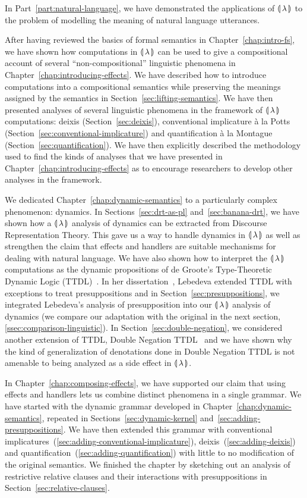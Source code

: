 In Part~\ref{part:natural-language}, we have demonstrated the applications
of ${\llparenthesis \, \lambda \, \rrparenthesis}$ to the problem of modelling the meaning of natural language
utterances.

After having reviewed the basics of formal semantics in
Chapter~\ref{chap:intro-fs}, we have shown how computations in ${\llparenthesis \, \lambda \, \rrparenthesis}$ can
be used to give a compositional account of several ``non-compositional''
linguistic phenomena in Chapter~\ref{chap:introducing-effects}. We have
described how to introduce computations into a compositional semantics
while preserving the meanings assigned by the semantics in
Section~\ref{sec:lifting-semantics}. We have then presented analyses of
several linguistic phenomena in the framework of ${\llparenthesis \, \lambda \, \rrparenthesis}$ computations:
deixis (Section~\ref{sec:deixis}), conventional implicature à la Potts
(Section~\ref{sec:conventional-implicature}) and quantification à la
Montague (Section~\ref{sec:quantification}). We have then explicitly
described the methodology used to find the kinds of analyses that we have
presented in Chapter~\ref{chap:introducing-effects} as to encourage
researchers to develop other analyses in the framework.

We dedicated Chapter~\ref{chap:dynamic-semantics} to a particularly complex
phenomenon: dynamics. In Sections~\ref{sec:drt-as-pl}
and~\ref{sec:banana-drt}, we have shown how a ${\llparenthesis \, \lambda \, \rrparenthesis}$ analysis of dynamics
can be extracted from Discourse Representation Theory. This gave us a way
to handle dynamics in ${\llparenthesis \, \lambda \, \rrparenthesis}$ as well as strengthen the claim that effects
and handlers are suitable mechanisms for dealing with natural language. We
have also shown how to interpret the ${\llparenthesis \, \lambda \, \rrparenthesis}$ computations as the dynamic
propositions of de Groote's Type-Theoretic Dynamic Logic
(TTDL)~\cite{de2006towards}. In her
dissertation~\cite{lebedeva2012expression}, Lebedeva extended TTDL with
exceptions to treat presuppositions and in
Section~\ref{sec:presuppositions}, we integrated Lebedeva's analysis of
presupposition into our ${\llparenthesis \, \lambda \, \rrparenthesis}$ analysis of dynamics (we compare our
adaptation with the original in the next section,
\ref{ssec:comparison-linguistic}). In Section~\ref{sec:double-negation}, we
considered another extension of TTDL, Double Negation
TTDL~\cite{qian2014accessibility} and we have shown why the kind of
generalization of denotations done in Double Negation TTDL is not amenable
to being analyzed as a side effect in ${\llparenthesis \, \lambda \, \rrparenthesis}$.

In Chapter~\ref{chap:composing-effects}, we have supported our claim that
using effects and handlers lets us combine distinct phenomena in a single
grammar. We have started with the dynamic grammar developed in
Chapter~\ref{chap:dynamic-semantics}, repeated in
Sections~\ref{sec:dynamic-kernel} and~\ref{sec:adding-presuppositions}. We
have then extended this grammar with conventional
implicatures~(\ref{sec:adding-conventional-implicature}),
deixis~(\ref{sec:adding-deixis}) and
quantification~(\ref{sec:adding-quantification}) with little to no
modification of the original semantics. We finished the chapter by
sketching out an analysis of restrictive relative clauses and their
interactions with presuppositions in Section~\ref{sec:relative-clauses}.


